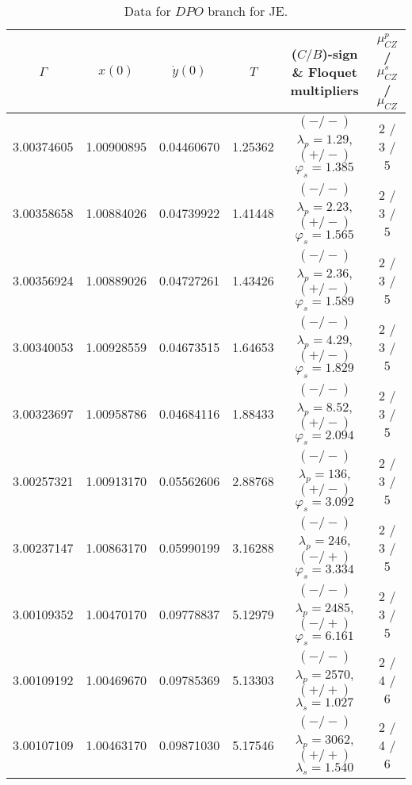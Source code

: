 \documentclass[reqno, 11pt]{amsart}
\theoremstyle{plain}
\theoremstyle{definition}
\theoremstyle{remark}
\begin{document}
\begin{table}[h]\fontsize{10}{10}\selectfont \centering
\caption{Data for $DPO$ branch for JE.}
	\begin{tabular}{c|c|c|c|c|c}
 \hline
		$\Gamma$ & $x(0)$ & $\dot{y}(0)$ & $T$ & ($C/B$)-sign \& Floquet multipliers & $\mu_{CZ}^p$ / $\mu_{CZ}^s$ / $\mu_{CZ}$\\
		\hline 3.00374605 & 1.00900895 & 0.04460670 & 1.25362 & $(-/-)$ $\lambda_p = 1.29$, $(+/-)$ $\varphi_s = 1.385$ & 2 / 3 / 5\\
		3.00358658 & 1.00884026 & 0.04739922 & 1.41448 & $(-/-)$ $\lambda_p = 2.23$, $(+/-)$ $\varphi_s = 1.565$ & 2 / 3 / 5\\
		3.00356924 & 1.00889026 & 0.04727261 & 1.43426 & $(-/-)$ $\lambda_p = 2.36$, $(+/-)$ $\varphi_s = 1.589$ & 2 / 3 / 5\\
		3.00340053 & 1.00928559 & 0.04673515 & 1.64653 & $(-/-)$ $\lambda_p = 4.29$, $(+/-)$ $\varphi_s = 1.829$ & 2 / 3 / 5 \\
        3.00323697 & 1.00958786 & 0.04684116 & 1.88433 & $(-/-)$ $\lambda_p = 8.52$, $(+/-)$ $\varphi_s = 2.094$ & 2 / 3 / 5 \\
		3.00257321 & 1.00913170 & 0.05562606 & 2.88768 & $(-/-)$ $\lambda_p = 136$, $(+/-)$ $\varphi_s = 3.092$ & 2 / 3 / 5 \\
		3.00237147 & 1.00863170 & 0.05990199 & 3.16288 & $(-/-)$ $\lambda_p = 246$, $(-/+)$ $\varphi_s = 3.334$ & 2 / 3 / 5 \\
		3.00109352 & 1.00470170 & 0.09778837 & 5.12979 & $(-/-)$ $\lambda_p = 2485$, $(-/+)$ $\varphi_s = 6.161$ & 2 / 3 / 5 \\
		3.00109192 & 1.00469670 & 0.09785369 & 5.13303 & $(-/-)$ $\lambda_p = 2570$, $(+/+)$ $\lambda_s = 1.027$ & 2 / 4 / 6 \\
		3.00107109 & 1.00463170 & 0.09871030 & 5.17546 & $(-/-)$ $\lambda_p = 3062$, $(+/+)$ $\lambda_s = 1.540$ & 2 / 4 / 6 
	\end{tabular}
	\label{data_dpo}
\end{table}
\end{document}
